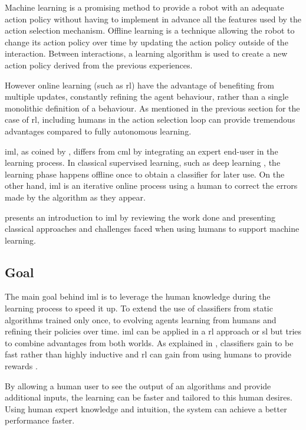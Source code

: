 Machine learning is a promising method to provide a robot with an adequate action policy without having to implement in advance all the features used by the action selection mechanism. Offline learning is a technique allowing the robot to change its action policy over time by updating the action policy outside of the interaction. Between interactions, a learning algorithm is used to create a new action policy derived from the previous experiences.

However online learning (such as \gls{rl}) have the advantage of benefiting from multiple updates, constantly refining the agent behaviour, rather than a single monolithic definition of a behaviour. As mentioned in the previous section for the case of \gls{rl}, including humans in the action selection loop can provide tremendous advantages compared to fully autonomous learning.

\acrfull{iml}, as coined by \cite{fails2003interactive}, differs from \acrfull{cml} by integrating an expert end-user in the learning process. In classical supervised learning, such as deep learning \cite{lecun2015deep}, the learning phase happens offline once to obtain a classifier for later use. On the other hand, \acrshort{iml} is an iterative online process using a human to correct the errors made by the algorithm as they appear.

\cite{amershi2014power} presents an introduction to \gls{iml} by reviewing the work done and presenting classical approaches and challenges faced when using humans to support machine learning.


\subsection{Goal}

The main goal behind \gls{iml} is to leverage the human knowledge during the learning process to speed it up. To extend the use of classifiers from static algorithms trained only once, to evolving agents learning from humans and refining their policies over time. \gls{iml} can be applied in a \gls{rl} approach or \gls{sl} but tries to combine advantages from both worlds. As explained in \cite{fails2003interactive}, classifiers gain to be fast rather than highly inductive and \gls{rl} can gain from using humans to provide rewards \cite{knox2009interactively}.

By allowing a human user to see the output of an algorithms and provide additional inputs, the learning can be faster and tailored to this human desires. Using human expert knowledge and intuition, the system can achieve a better performance faster.

